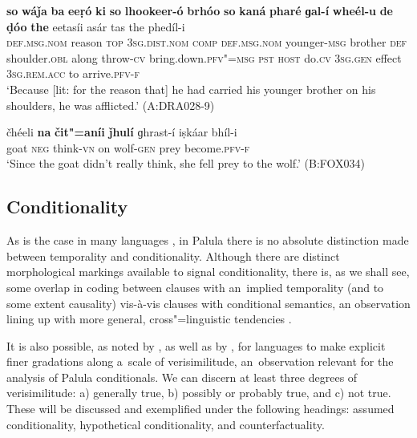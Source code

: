 \begin{exe}
\ex
\label{ex:13-92}
\gll \textbf{so} \textbf{wáǰa} \textbf{ba} \textbf{eeṛó} \textbf{ki} \textbf{so} \textbf{lhookeer-ó} \textbf{brhóo} \textbf{so} \textbf{kaná} \textbf{pharé} \textbf{ɡal-í} \textbf{wheél-u} \textbf{de} \textbf{ḍóo} \textbf{the} eetasíi asár tas the phedíl-i \\
\textsc{def.msg.nom} reason \textsc{top} \textsc{3sg.dist.nom} \textsc{comp} \textsc{def.msg.nom} younger-\textsc{msg} brother \textsc{def}{\protect\footnotemark} shoulder.\textsc{obl} along throw-\textsc{cv} bring.down.\textsc{pfv"=msg} \textsc{pst} \textsc{host} do.\textsc{cv}  \textsc{3sg.gen} effect \textsc{3sg.rem.acc} to arrive.\textsc{pfv-f} \\
\glt `Because [lit: for the reason that] he had carried his younger brother on his shoulders, he was afflicted.' (A:DRA028-9)

\ex
\label{ex:13-93}
\gll čhéeli \textbf{na} \textbf{čit"=aníi} \textbf{ǰhulí} ɡhrast-í iṣkáar bhíl-i \\
goat \textsc{neg} think-\textsc{vn} on wolf-\textsc{gen} prey become.\textsc{pfv-f}  \\
\glt `Since the goat didn't really think, she fell prey to the wolf.' (B:FOX034)
\end{exe}


\subsection{Conditionality}
\label{subsec:13-4-4}

As is the case in many languages \citep[257--258]{thompsonetal2007}, in Palula there is no absolute distinction made between temporality and conditionality. Although there are distinct morphological markings available to signal conditionality, there is, as we shall see, some overlap in coding between clauses with an~implied temporality (and to some extent causality) vis-à-vis clauses with conditional semantics, an observation lining up with more general, cross"=linguistic tendencies \citep[161]{cristofaro2005}.



It is also possible, as noted by \citet[255--260]{thompsonetal2007}, as well as by \citet[333--334]{givon2001b}, for languages to make explicit finer gradations along a~scale of verisimilitude, an~observation relevant for the analysis of Palula conditionals. We can discern at least three degrees of verisimilitude: a) generally true, b) possibly or probably true, and c) not true. These will be discussed and exemplified under the following headings: assumed conditionality, hypothetical conditionality, and counterfactuality.



